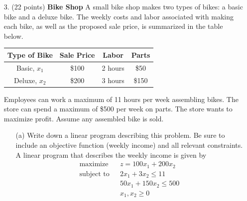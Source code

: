 \documentclass{article}
\begin{document}
\begin{itemize}
    \item[3.] (22 points) \textbf{Bike Shop}
    \newline\newline
    A small bike shop makes two types of bikes: a basic bike and a deluxe bike. The weekly costs and labor associated with making each bike, as well as the proposed sale price, is summarized in the table below.
    \begin{center}
        \begin{tabular}{||c|c|c|c||}
            \hline
             Type of Bike & Sale Price & Labor & Parts \\
             \hline\hline
             Basic, $x_1$ & \$100 & 2 hours & \$50 \\ 
             \hline
             Deluxe, $x_2$ & \$200 & 3 hours & \$150\\
             \hline
        \end{tabular}
    \end{center}
    Employees can work a maximum of 11 hours per week assembling bikes. The store can spend a maximum of \$500 per week on parts. The store wants to maximize profit. Assume any assembled bike is sold.
    \begin{itemize}
        \item[(a)] Write down a linear program describing this problem. Be sure to include an objective function (weekly income) and all relevant constraints.
        \newline\newline
        A linear program that describes the weekly income is given by
        \begin{align*}
            \text{maximize}\:\:\:\: &z = 100x_1 + 200x_2\\
            \text{subject to} \:\:\: &2x_1 + 3x_2 \leq 11\\
            &50x_1 + 150x_2 \leq 500\\
            &x_1,x_2 \geq 0
        \end{align*}
        


\end{itemize}
\end{itemize}
\end{document}
